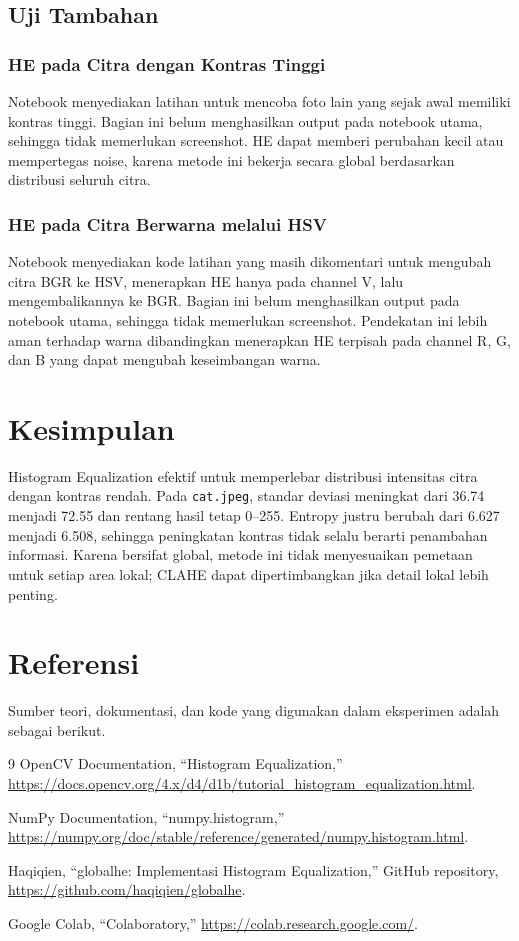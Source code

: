 \documentclass[12pt,a4paper]{article}
\begin{document}
\subsection{Uji Tambahan}

\subsubsection{HE pada Citra dengan Kontras Tinggi}
Notebook menyediakan latihan untuk mencoba foto lain yang sejak awal memiliki kontras tinggi. Bagian ini belum menghasilkan output pada notebook utama, sehingga tidak memerlukan screenshot. HE dapat memberi perubahan kecil atau mempertegas noise, karena metode ini bekerja secara global berdasarkan distribusi seluruh citra.

\subsubsection{HE pada Citra Berwarna melalui HSV}
Notebook menyediakan kode latihan yang masih dikomentari untuk mengubah citra BGR ke HSV, menerapkan HE hanya pada channel V, lalu mengembalikannya ke BGR. Bagian ini belum menghasilkan output pada notebook utama, sehingga tidak memerlukan screenshot. Pendekatan ini lebih aman terhadap warna dibandingkan menerapkan HE terpisah pada channel R, G, dan B yang dapat mengubah keseimbangan warna.

\section{Kesimpulan}
Histogram Equalization efektif untuk memperlebar distribusi intensitas citra dengan kontras rendah. Pada \texttt{cat.jpeg}, standar deviasi meningkat dari 36.74 menjadi 72.55 dan rentang hasil tetap 0--255. Entropy justru berubah dari 6.627 menjadi 6.508, sehingga peningkatan kontras tidak selalu berarti penambahan informasi. Karena bersifat global, metode ini tidak menyesuaikan pemetaan untuk setiap area lokal; CLAHE dapat dipertimbangkan jika detail lokal lebih penting.

\section{Referensi}
Sumber teori, dokumentasi, dan kode yang digunakan dalam eksperimen adalah sebagai berikut.

\begin{thebibliography}{9}
    OpenCV Documentation, ``Histogram Equalization,''
    \url{https://docs.opencv.org/4.x/d4/d1b/tutorial_histogram_equalization.html}.

    NumPy Documentation, ``numpy.histogram,''
    \url{https://numpy.org/doc/stable/reference/generated/numpy.histogram.html}.

    Haqiqien, ``globalhe: Implementasi Histogram Equalization,''
    GitHub repository, \url{https://github.com/haqiqien/globalhe}.

    Google Colab, ``Colaboratory,''
    \url{https://colab.research.google.com/}.
\end{thebibliography}
\end{document}
